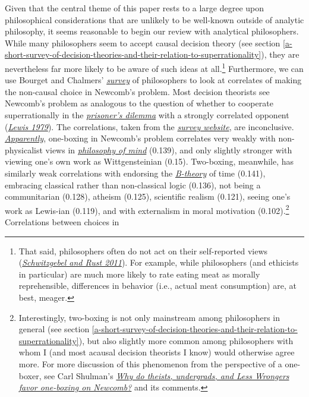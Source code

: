 Given that the central theme of this paper rests to a large degree upon
philosophical considerations that are unlikely to be well-known outside
of analytic philosophy, it seems reasonable to begin our review with
analytical philosophers. While many philosophers seem to accept causal
decision theory (see section
\ref{a-short-survey-of-decision-theories-and-their-relation-to-superrationality}), they are nevertheless far more likely to be aware
of such ideas at all.\footnote{That said, philosophers often do not act
  on their self-reported views
  (\href{http://www.faculty.ucr.edu/~eschwitz/SchwitzAbs/EthSelfRep.htm}{\emph{Schwitzgebel
  and Rust 2011}}). For example, while philosophers (and ethicists in
  particular) are much more likely to rate eating meat as morally
  reprehensible, differences in behavior (i.e., actual meat consumption)
  are, at best, meager.} Furthermore, we can use Bourget and Chalmers'
\href{http://philpapers.org/archive/BOUWDP}{\emph{survey}} of
philosophers to look at correlates of making the non-causal choice in
Newcomb's problem. Most decision theorists see Newcomb's problem as
analogous to the question of whether to cooperate superrationally in the
\href{https://en.wikipedia.org/wiki/Prisoner\%27s_dilemma}{\emph{prisoner's
dilemma}} with a strongly correlated opponent
(\href{https://sl4librarian.files.wordpress.com/2017/01/lewis-prisoners-dilemma-newcomb-problem.pdf}{\emph{Lewis
1979}}). The correlations, taken from the
\href{http://philpapers.org/surveys}{\emph{survey website}}, are
inconclusive.
\href{http://philpapers.org/surveys/linear_most.pl}{\emph{Apparently}},
one-boxing in Newcomb's problem correlates very weakly with
non-physicalist views in
\href{https://en.wikipedia.org/wiki/Philosophy_of_mind}{\emph{philosophy
of mind}} (0.139), and only slightly stronger with viewing one's own
work as Wittgensteinian (0.15). Two-boxing, meanwhile, has similarly
weak correlations with endorsing the
\href{https://en.wikipedia.org/wiki/B-theory_of_time}{\emph{B-theory}}
of time (0.141), embracing classical rather than non-classical logic
(0.136), not being a communitarian (0.128), atheism (0.125), scientific
realism (0.121), seeing one's work as Lewis-ian (0.119), and with
externalism in moral motivation (0.102).\footnote{Interestingly,
  two-boxing is not only mainstream among philosophers in general (see
  section
  \ref{a-short-survey-of-decision-theories-and-their-relation-to-superrationality}), but also slightly more common among
  philosophers with whom I (and most acausal decision theorists I know)
  would otherwise agree more. For more discussion of this phenomenon
  from the perspective of a one-boxer, see Carl Shulman's
  \href{http://lesswrong.com/lw/hqs/why_do_theists_undergrads_and_less_wrongers_favor/}{\emph{\emph{Why
  do theists, undergrads, and Less Wrongers favor one-boxing on
  Newcomb?}}} and its comments.} Correlations between choices in
